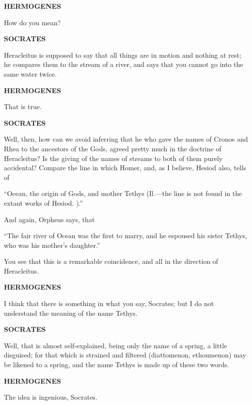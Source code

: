 \documentclass[11pt,letter]{article}
\begin{document}
\par \textbf{HERMOGENES}
\par   How do you mean?

\par \textbf{SOCRATES}
\par   Heracleitus is supposed to say that all things are in motion and nothing at rest; he compares them to the stream of a river, and says that you cannot go into the same water twice.

\par \textbf{HERMOGENES}
\par   That is true.

\par \textbf{SOCRATES}
\par   Well, then, how can we avoid inferring that he who gave the names of Cronos and Rhea to the ancestors of the Gods, agreed pretty much in the doctrine of Heracleitus? Is the giving of the names of streams to both of them purely accidental? Compare the line in which Homer, and, as I believe, Hesiod also, tells of

\par  “Ocean, the origin of Gods, and mother Tethys (Il.—the line is not found in the extant works of Hesiod. ).”

\par  And again, Orpheus says, that

\par  “The fair river of Ocean was the first to marry, and he espoused his sister Tethys, who was his mother’s daughter.”

\par  You see that this is a remarkable coincidence, and all in the direction of Heracleitus.

\par \textbf{HERMOGENES}
\par   I think that there is something in what you say, Socrates; but I do not understand the meaning of the name Tethys.

\par \textbf{SOCRATES}
\par   Well, that is almost self-explained, being only the name of a spring, a little disguised; for that which is strained and filtered (diattomenon, ethoumenon) may be likened to a spring, and the name Tethys is made up of these two words.

\par \textbf{HERMOGENES}
\par   The idea is ingenious, Socrates.
\end{document}
